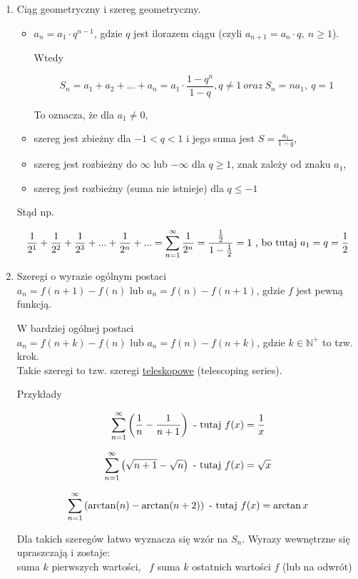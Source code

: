\begin{enumerate}
    \item Ciąg geometryczny i szereg geometryczny.
    \begin{itemize}
        \item 
        $ a_n = a_1 \cdot q^{n-1} $, gdzie $q$ jest ilorazem ciągu (czyli $a_{n+1} = a_n \cdot q , \ n \geq 1$).
        
        Wtedy

        $$ S_n = a_1 + a_2 + ... + a_n = a_1 \cdot \frac{1 - q^n}{1 - q}, q \neq 1 \ oraz \ S_n = na_1, \ q = 1 $$

        To oznacza, że dla $ a_1 \neq 0 $,

        \item szereg jest zbieżny dla $ -1 < q < 1 $ i jego suma jest $ S = \frac{a_1}{1 - q} $,
        \item szereg jest rozbieżny do $\infty$ lub $-\infty$ dla $ q \geq 1 $, znak zależy od znaku $a_1$,
        \item szereg jest rozbieżny (suma nie istnieje) dla $ q \leq -1 $ \\
    \end{itemize}

    Stąd np.

    $$ \frac{1}{2^1} + \frac{1}{2^2} + \frac{1}{2^3} + ... + \frac{1}{2^n} + ... = \suminfty{1} \frac{1}{2^n} =
    \frac{ \frac{1}{2} }{ 1 - \frac{1}{2} } = 1 \ \textrm{, bo tutaj} \ a_1 = q = \frac{1}{2} $$

    \item Szeregi o wyrazie ogólnym postaci \\
    $ a_n = f(n + 1) - f(n)$ lub $ a_n = f(n) - f(n + 1) $, gdzie $f$ jest pewną funkcją.

    W bardziej ogólnej postaci \\
    \quad $ a_n = f(n + k) - f(n) $ lub $ a_n = f(n) - f(n + k) $, gdzie $ k \in \mathbb{N}^+ $ to tzw. krok. \\
    
    Takie szeregi to tzw. szeregi \underline{teleskopowe} (telescoping series).

    Przykłady

    $$ \sum\limits_{n = 1}^{\infty} \left( \frac{1}{n} - \frac{1}{n + 1} \right) \ \textrm{- tutaj} \ f(x) = \frac{1}{x} $$

    $$ \sum\limits_{n = 1}^{\infty} \left( \sqrt{n + 1} - \sqrt{n} \right) \ \textrm{- tutaj} \ f(x) = \sqrt{x} $$

    $$ \sum\limits_{n = 1}^{\infty} \left( \arctan(n) - \arctan(n+2) \right) \ \textrm{- tutaj} \ f(x) = \arctan x $$

    Dla takich szeregów łatwo wyznacza się wzór na $S_n$. Wyrazy wewnętrzne się upraszczają i zostaje: \\
    suma $k$ pierwszych wartości, \ $f$ suma $k$ ostatnich wartości $f$ (lub na odwrót) \\

\end{enumerate}

